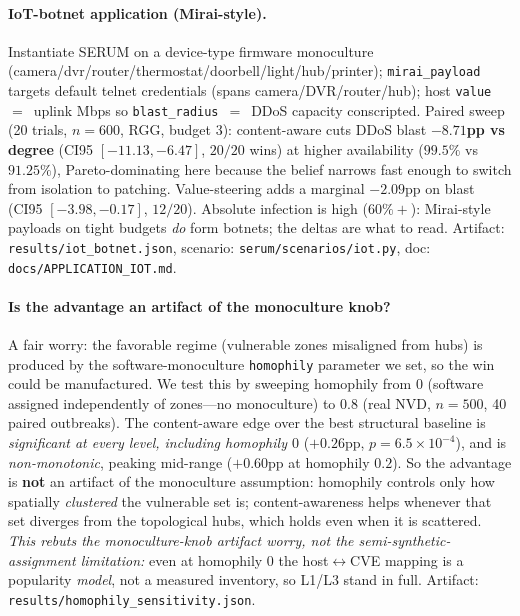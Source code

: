 \documentclass[11pt]{article}
\begin{document}
\paragraph{IoT-botnet application (Mirai-style).}
Instantiate SERUM on a device-type firmware monoculture
(camera/dvr/router/thermostat/doorbell/light/hub/printer);
\texttt{mirai\_payload} targets default telnet credentials (spans
camera/DVR/router/hub); host \texttt{value}~$=$~uplink Mbps so
\texttt{blast\_radius}~$=$~DDoS capacity conscripted. Paired sweep (20 trials,
$n{=}600$, RGG, budget $3$): content-aware cuts DDoS blast \textbf{$-8.71$pp
vs degree} (CI95 $[-11.13,-6.47]$, $20/20$ wins) at higher availability
($99.5\%$ vs $91.25\%$), Pareto-dominating here because the belief narrows fast
enough to switch from isolation to patching. Value-steering adds a marginal
$-2.09$pp on blast (CI95 $[-3.98,-0.17]$, $12/20$). Absolute infection is high
($60\%+$): Mirai-style payloads on tight budgets \emph{do} form botnets; the
deltas are what to read. Artifact: \texttt{results/iot\_botnet.json},
scenario: \texttt{serum/scenarios/iot.py}, doc:
\texttt{docs/APPLICATION\_IOT.md}.

\paragraph{Is the advantage an artifact of the monoculture knob?}
A fair worry: the favorable regime (vulnerable zones misaligned from hubs) is
produced by the software-monoculture \texttt{homophily} parameter we set, so the
win could be manufactured. We test this by sweeping homophily from $0$ (software
assigned independently of zones---no monoculture) to $0.8$ (real NVD, $n{=}500$,
40 paired outbreaks). The content-aware edge over the best structural baseline is
\emph{significant at every level, including homophily $0$} ($+0.26$pp,
$p=6.5\times10^{-4}$), and is \emph{non-monotonic}, peaking mid-range
($+0.60$pp at homophily $0.2$). So the advantage is \textbf{not} an artifact of
the monoculture assumption: homophily controls only how spatially \emph{clustered}
the vulnerable set is; content-awareness helps whenever that set diverges from the
topological hubs, which holds even when it is scattered. \emph{This rebuts the
monoculture-\emph{knob} artifact worry, not the semi-synthetic-assignment
limitation:} even at homophily $0$ the host$\leftrightarrow$CVE mapping is a
popularity \emph{model}, not a measured inventory, so L1/L3 stand in full.
Artifact: \texttt{results/homophily\_sensitivity.json}.
\end{document}
